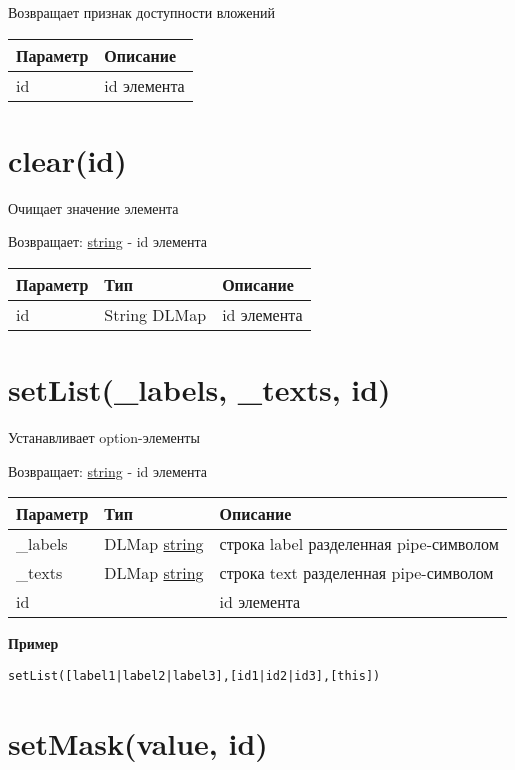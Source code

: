 Возвращает признак доступности вложений


\begin{longtable}[]{@{}ll@{}}
\toprule
Параметр & Описание\tabularnewline
\midrule
\endhead
id & id элемента\tabularnewline
\bottomrule
\end{longtable}

\hypertarget{clearid-string}{%
\section{clear(id)}\label{clearid-string}}

Очищает значение элемента

Возвращает: \protect\hyperlink{string}{string} - id элемента

\begin{longtable}[]{@{}lll@{}}
\toprule
Параметр & Тип & Описание\tabularnewline
\midrule
\endhead
id & String \textbar{} DLMap & id элемента\tabularnewline
\bottomrule
\end{longtable}

\hypertarget{setlist}{%
\section{setList(\_labels, \_texts, id)}\label{setlist}}

Устанавливает
option-элементы

Возвращает: \protect\hyperlink{string}{string} - id элемента

\begin{longtable}[]{@{}lll@{}}
\toprule
Параметр & Тип & Описание\tabularnewline
\midrule
\endhead
\_labels & DLMap \textbar{} \protect\hyperlink{string}{string} & строка
label разделенная pipe-символом\tabularnewline
\_texts & DLMap \textbar{} \protect\hyperlink{string}{string} & строка
text разделенная pipe-символом\tabularnewline
id & & id элемента\tabularnewline
\bottomrule
\end{longtable}

\textbf{Пример}

\begin{verbatim}
setList([label1|label2|label3],[id1|id2|id3],[this])
\end{verbatim}

\hypertarget{setmaskvalue-id}{%
\section{setMask(value, id)}\label{setmaskvalue-id}}

